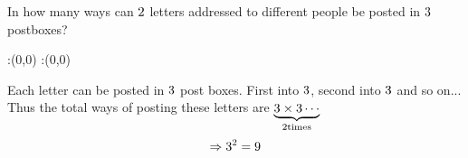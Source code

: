 



\question[4] In how many ways can $2$ letters addressed to different people be posted in $3$ postboxes?


\watchout

\ifprintanswers
  \begin{marginfigure}
      :(0,0)
      :(0,0)
    \figdrawbegin{}
      \figdrawline [100,101]
    \figdrawend
    \figvisu{\figBoxA}{}{%
    }
    \centerline{\box\figBoxA}
  \end{marginfigure}
\fi 

\begin{solution}[\mcq]
Each letter can be posted in $3$ post boxes. First into $3$, second into $3$ and so on...\\
Thus the total ways of posting these letters are $\underbrace{3 \times 3 \cdots}_{2 \text{times}}$\\
\begin{align}
\Rightarrow {3}^{2} = {9}
\end{align}  
\end{solution}

